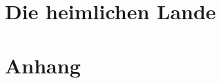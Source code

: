 \documentclass[letterpaper,twocolumn,openany,nodeprecatedcode]{scrbook}
\begin{document}








\part{Die heimlichen Lande}







\part*{Anhang}



\newpage





\end{document}
